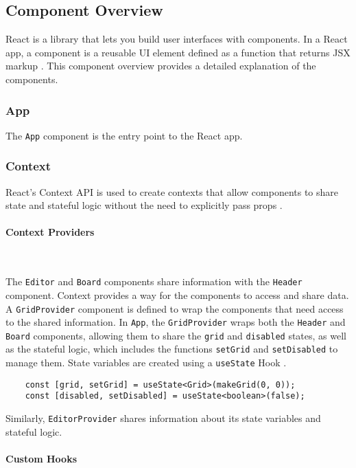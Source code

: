 \subsection{Component Overview}
React is a library that lets you build user interfaces with components. In a React app, a component is a reusable UI element defined as a function that returns JSX markup \cite{react-component}. This component overview provides a detailed explanation of the components.

\subsubsection{App}
The \texttt{App} component is the entry point to the React app.

\subsubsection{Context}
React’s Context API is used to create contexts that allow components to share state and stateful logic without the need to explicitly pass props \cite{react-context}.

\paragraph{Context Providers} \

The \texttt{Editor} and \texttt{Board} components share information with the \texttt{Header} component. Context provides a way for the components to access and share data. A \texttt{GridProvider} component is defined to wrap the components that need access to the shared information. In \texttt{App}, the \texttt{GridProvider} wraps both the \texttt{Header} and \texttt{Board} components, allowing them to share the \texttt{grid} and \texttt{disabled} states, as well as the stateful logic, which includes the functions \texttt{setGrid} and \texttt{setDisabled} to manage them. State variables are created using a \texttt{useState} Hook \cite{react-hooks}.

\begin{verbatim}
    const [grid, setGrid] = useState<Grid>(makeGrid(0, 0));
    const [disabled, setDisabled] = useState<boolean>(false);
\end{verbatim}

Similarly, \texttt{EditorProvider} shares information about its state variables and stateful logic.

\paragraph{Custom Hooks} \

